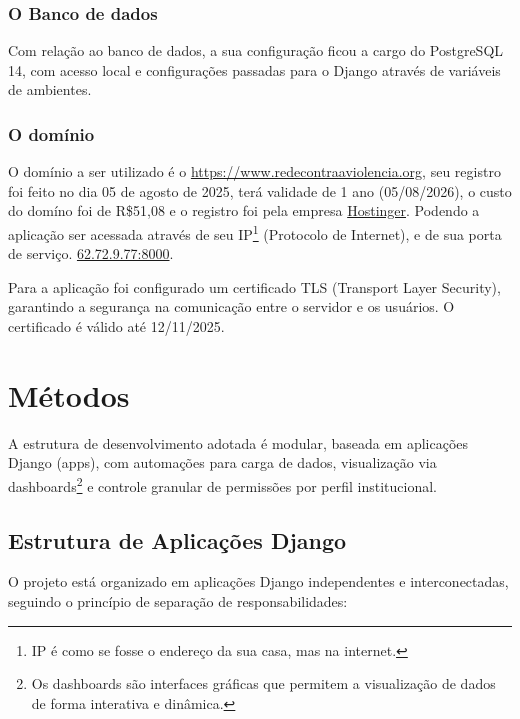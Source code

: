 \subsubsection{O Banco de dados}
\par Com relação ao banco de dados, a sua configuração ficou a cargo do PostgreSQL 14, com acesso local e configurações passadas para o Django através de variáveis de ambientes.

\subsubsection{O domínio}
\par O domínio a ser utilizado é o \href{https://www.redecontraaviolencia.org}{https://www.redecontraaviolencia.org}, seu registro foi feito no dia 05 de agosto de 2025, terá validade de 1 ano (05/08/2026), o custo do domíno foi de R\$51,08 e o registro foi pela empresa \href{https://www.hostinger.com/br}{Hostinger}. Podendo a aplicação ser acessada através de seu IP\footnote{IP é como se fosse o endereço da sua casa, mas na internet.} (Protocolo de Internet), e de sua porta de serviço. \href{62.72.9.77:8000}{62.72.9.77:8000}.
\par Para a aplicação foi configurado um certificado TLS (Transport Layer Security), garantindo a segurança na comunicação entre o servidor e os usuários. O certificado é válido até 12/11/2025.


\section{Métodos}

A estrutura de desenvolvimento adotada é modular, baseada em aplicações Django (apps), com automações para carga de dados, visualização via dashboards\footnote{Os dashboards são interfaces gráficas que permitem a visualização de dados de forma interativa e dinâmica.} e controle granular de permissões por perfil institucional.

\subsection{Estrutura de Aplicações Django}
\par O projeto está organizado em aplicações Django independentes e interconectadas, seguindo o princípio de separação de responsabilidades:


